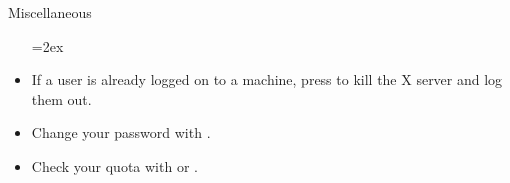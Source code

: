 \begin{block}{Miscellaneous}
  \begin{itemize}
    \hangindent=2ex
  \item If a user is already logged on to a machine, press  to kill the X server and log them out.
  \item Change your password with .
  \item Check your quota with  or .
  \end{itemize}
\end{block}
